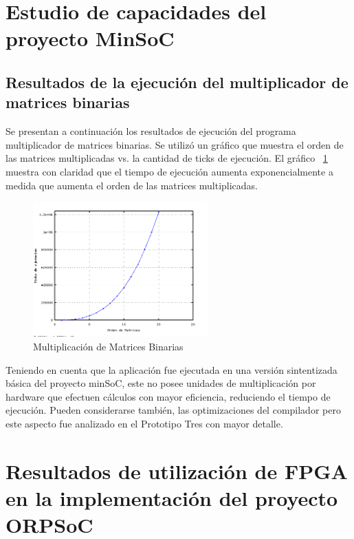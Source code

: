 \newpage
\section {Estudio de capacidades del proyecto MinSoC}
		\subsection{Resultados de la ejecución del multiplicador de matrices binarias}
		Se presentan a continuación los resultados de ejecución del programa multiplicador de matrices binarias. Se utilizó un gráfico que muestra el orden
		de las matrices multiplicadas vs. la cantidad de ticks de ejecución. El gráfico ~\ref{fig:mulmat} muestra con claridad que el tiempo de ejecución
		aumenta exponencialmente a medida que aumenta el orden de las matrices multiplicadas.  
		
\begin{figure}[h!]
 	\begin{center}
  	\includegraphics[width=0.6\textwidth,keepaspectratio=true]{./images/matrices}
  	\caption{Multiplicación de Matrices Binarias}
  	\label{fig:mulmat}
 	\end{center}
	\end{figure}

		Teniendo en cuenta que la aplicación fue ejecutada en una versión sintentizada básica del proyecto minSoC, este no posee unidades de multiplicación
		por hardware que efectuen cálculos con mayor eficiencia, reduciendo el tiempo de ejecución. Pueden considerarse también, las optimizaciones del
		compilador pero este aspecto fue analizado en el Prototipo Tres con mayor detalle. 
		
\newpage
	\section{Resultados de utilización de FPGA en la implementación del proyecto ORPSoC}
	
